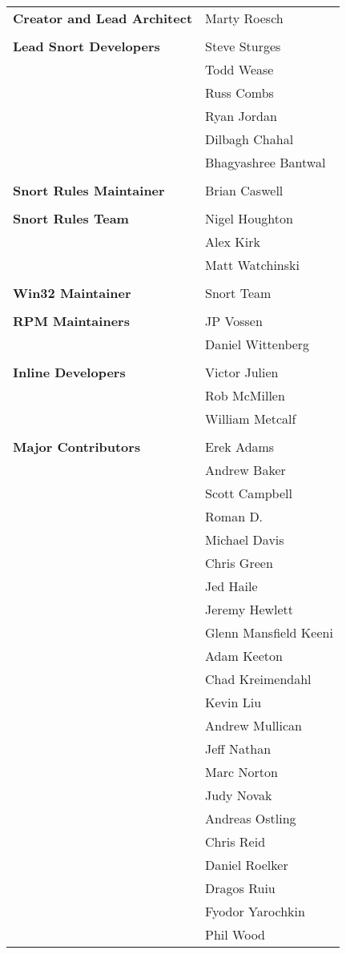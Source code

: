 \documentclass[english]{report}
\begin{document}
\begin{tabular}{p{3in} p{3in}}

\textbf{Creator and Lead Architect}
& Marty Roesch\\
\\
\textbf{Lead Snort Developers}
& Steve Sturges\\
& Todd Wease\\
& Russ Combs\\
& Ryan Jordan\\
& Dilbagh Chahal\\
& Bhagyashree Bantwal\\
\\
\textbf{Snort Rules Maintainer}
& Brian Caswell\\
\\
\textbf{Snort Rules Team}
& Nigel Houghton\\
& Alex Kirk\\
& Matt Watchinski\\
\\
\textbf{Win32 Maintainer}
& Snort Team\\
\\
\textbf{RPM Maintainers}
& JP Vossen\\
& Daniel Wittenberg\\
\\
\textbf{Inline Developers}
& Victor Julien\\
& Rob McMillen\\
& William Metcalf\\
\\
\textbf{Major Contributors}
& Erek Adams\\
& Andrew Baker\\
& Scott Campbell\\
& Roman D.\\
& Michael Davis\\
& Chris Green\\
& Jed Haile\\
& Jeremy Hewlett\\
& Glenn Mansfield Keeni\\
& Adam Keeton\\
& Chad Kreimendahl\\
& Kevin Liu\\
& Andrew Mullican\\
& Jeff Nathan\\
& Marc Norton\\
& Judy Novak\\
& Andreas Ostling\\
& Chris Reid\\
& Daniel Roelker\\
& Dragos Ruiu\\
& Fyodor Yarochkin\\
& Phil Wood
\end{tabular}
\appendix
\end{document}
